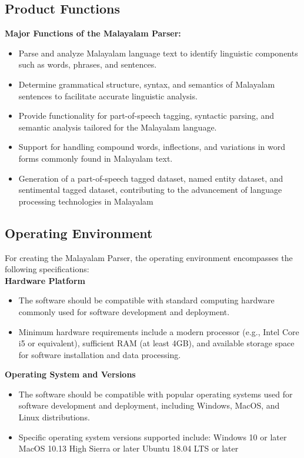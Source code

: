 \documentclass[12pt]{article}
\begin{document}
	\newpage
	\subsection{Product Functions}
	\textbf{Major Functions of the Malayalam Parser:}
	
	\begin{itemize}[label=-]
		\item Parse and analyze Malayalam language text to identify linguistic components such as
		words, phrases, and sentences.
		\item Determine grammatical structure, syntax, and semantics of Malayalam sentences to
		facilitate accurate linguistic analysis.
		\item Provide functionality for part-of-speech tagging, syntactic parsing, and semantic
		analysis tailored for the Malayalam language.
		\item Support for handling compound words, inflections, and variations in word forms
		commonly found in Malayalam text.
		\item Generation of a part-of-speech tagged dataset, named entity dataset, and sentimental tagged dataset, contributing to the advancement of language processing technologies in Malayalam
	\end{itemize}

	\subsection{Operating Environment}
	For creating the Malayalam Parser, the operating environment encompasses the following
	specifications:\\
	\textbf{Hardware Platform}
	
	\begin{itemize}[label=-]
		\item The software should be compatible with standard computing hardware commonly
		used for software development and deployment.
		\item Minimum hardware requirements include a modern processor (e.g., Intel Core i5 or
		equivalent), sufficient RAM (at least 4GB), and available storage space for software
		installation and data processing.
	\end{itemize}

	\textbf{Operating System and Versions}
	
	\begin{itemize}[label=-]
		\item The software should be compatible with popular operating systems used for
		software development and deployment, including Windows, MacOS, and Linux
		distributions.
		\item Specific operating system versions supported include:
		\subitem Windows 10 or later
		\subitem MacOS 10.13 High Sierra or later
		\subitem Ubuntu 18.04 LTS or later
	\end{itemize}
	
\end{document}
